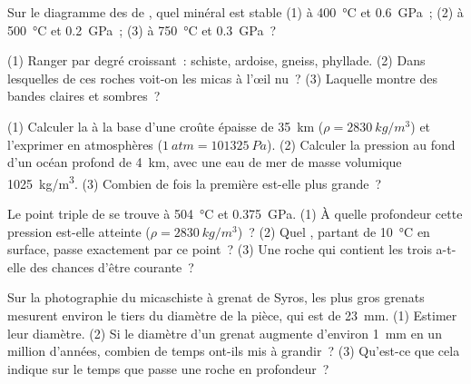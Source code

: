 \begin{exercise}[$\star$]\label{exo:g12:metamorphic-rocks:4}
Sur le diagramme des  de , quel minéral est stable
(1) à \qty{400}{\celsius} et \qty{0.6}{GPa}~; (2) à \qty{500}{\celsius} et
\qty{0.2}{GPa}~; (3) à \qty{750}{\celsius} et \qty{0.3}{GPa}~?
\end{exercise}

\begin{exercise}[$\star$]\label{exo:g12:metamorphic-rocks:5}
(1) Ranger par degré croissant~: schiste, ardoise, gneiss, phyllade. (2) Dans
lesquelles de ces roches voit-on les micas à l'œil nu~? (3) Laquelle montre
des bandes claires et sombres~?
\end{exercise}

\begin{exercise}[$\star\star$]\label{exo:g12:metamorphic-rocks:6}
(1) Calculer la  à la base d'une croûte épaisse de
\qty{35}{km} ($\rho = \qty{2830}{kg/m^3}$) et l'exprimer en atmosphères
($\qty{1}{atm} = \qty{101325}{Pa}$). (2) Calculer la pression au fond d'un
océan profond de \qty{4}{km}, avec une eau de mer de masse volumique
\qty{1025}{kg/m^3}. (3) Combien de fois la première est-elle plus
grande~?
\end{exercise}

\begin{exercise}[$\star\star$]\label{exo:g12:metamorphic-rocks:7}
Le point triple de  se trouve à \qty{504}{\celsius} et
\qty{0.375}{GPa}. (1) À quelle profondeur cette pression est-elle atteinte
($\rho =
\qty{2830}{kg/m^3}$)~? (2) Quel , partant de
\qty{10}{\celsius} en surface, passe exactement par ce point~? (3) Une
roche qui contient les trois  a-t-elle des chances d'être
courante~?
\end{exercise}

\begin{exercise}[$\star\star$]\label{exo:g12:metamorphic-rocks:8}
Sur la photographie du micaschiste à grenat de Syros, les plus gros grenats
mesurent environ le tiers du diamètre de la pièce, qui est de
\qty{23}{mm}. (1) Estimer leur diamètre. (2) Si le diamètre d'un grenat
augmente d'environ \qty{1}{mm} en un million d'années, combien de temps
ont-ils mis à grandir~? (3) Qu'est-ce que cela indique sur le temps que
passe une roche en profondeur~?
\end{exercise}

